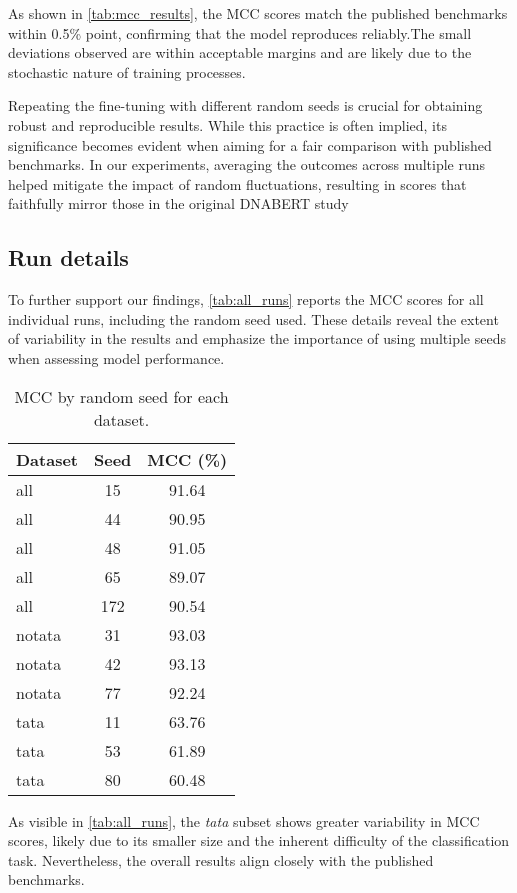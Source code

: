 As shown in \autoref{tab:mcc_results}, the MCC scores match the published benchmarks within 0.5\% point, confirming that the model reproduces reliably.The small deviations observed are within acceptable margins and are likely due to the stochastic nature of training processes.

Repeating the fine-tuning with different random seeds is crucial for obtaining robust and reproducible results. While this practice is often implied, its significance becomes evident when aiming for a fair comparison with published benchmarks. In our experiments, averaging the outcomes across multiple runs helped mitigate the impact of random fluctuations, resulting in scores that faithfully mirror those in the original DNABERT study

\subsection{Run details}

To further support our findings, \autoref{tab:all_runs} reports the MCC scores for all individual runs, including the random seed used. These details reveal the extent of variability in the results and emphasize the importance of using multiple seeds when assessing model performance.

\begin{table}[h!]
    \centering
    \small %
    \begin{tabular}{lcc}
        \toprule
        Dataset & Seed & MCC (\%) \\
        \midrule
        all    & 15  & 91.64 \\
        all    & 44  & 90.95 \\
        all    & 48  & 91.05 \\
        all    & 65  & 89.07 \\
        all    & 172 & 90.54 \\
        notata & 31  & 93.03 \\
        notata & 42  & 93.13 \\
        notata & 77  & 92.24 \\
        tata   & 11  & 63.76 \\
        tata   & 53  & 61.89 \\
        tata   & 80  & 60.48 \\
        \bottomrule
    \end{tabular}
    \caption{MCC by random seed for each dataset.}
    \label{tab:all_runs}
\end{table}

As visible in \autoref{tab:all_runs}, the \textit{tata} subset shows greater variability in MCC scores, likely due to its smaller size and the inherent difficulty of the classification task. Nevertheless, the overall results align closely with the published benchmarks.
